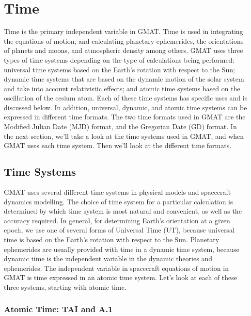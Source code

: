 \chapter{Time } \label{Ch:TimeSystems} 

Time is the primary independent variable in GMAT.  Time is used in
integrating the equations of motion, and calculating planetary
ephemerides, the orientations of planets and moons, and atmospheric
density among others.  GMAT uses three types of time systems
depending on the type of calculations being performed: universal
time systems based on the Earth's rotation with respect to the Sun;
dynamic time systems that are based on the dynamic motion of the
solar system and take into account relativistic effects; and atomic
time systems based on the oscillation of the cesium atom. Each of
these time systems has specific uses and is discussed below.  In
addition,  universal, dynamic, and atomic time systems can be
expressed in different time formats.  The two time formats used in
GMAT are the Modified Julian Date (MJD) format, and the Gregorian
Date (GD) format.  In the next section, we'll take a look at the
time systems used in GMAT, and when GMAT uses each time system. Then
we'll look at the different time formats.

\section{Time Systems}

GMAT uses several different time systems in physical models and
spacecraft dynamics modelling.  The choice of time system for  a
particular calculation is determined by which time system is most
natural and convenient, as well as the  accuracy required.  In
general, for determining Earth's orientation at a given epoch, we
use one of several forms of Universal Time (UT), because universal
time is based on the Earth's rotation with respect to the Sun.
Planetary ephemerides are usually provided with time in a dynamic
time system, because dynamic time is the independent variable in the
dynamic theories and ephemerides.  The independent variable in
spacecraft equations of motion in GMAT is time expressed in an
atomic time system.  Let's look at each of these three systems,
starting with atomic time.

\subsection{Atomic Time:  TAI and A.1} 
 \label{Sec:AtomicTime}

